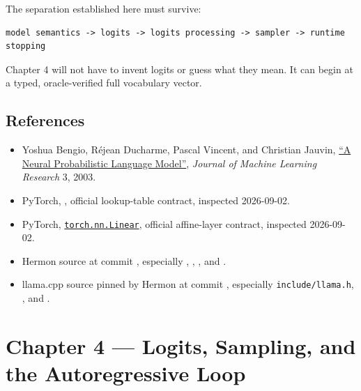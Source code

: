 \documentclass[
  10pt,
]{article}
\providecommand{\tightlist}{%
  \setlength{\itemsep}{0pt}\setlength{\parskip}{0pt}}
\begin{document}
The separation established here must survive:

\begin{verbatim}
model semantics -> logits -> logits processing -> sampler -> runtime stopping
\end{verbatim}

Chapter 4 will not have to invent logits or guess what they mean. It can
begin at a typed, oracle-verified full vocabulary vector.

\subsection{References}\label{references}

\begin{itemize}
\tightlist
\item
  Yoshua Bengio, Réjean Ducharme, Pascal Vincent, and Christian Jauvin,
  \href{https://jmlr.org/papers/v3/bengio03a.html}{``A Neural
  Probabilistic Language Model''}, \emph{Journal of Machine Learning
  Research} 3, 2003.
\item
  PyTorch,
  \href{https://docs.pytorch.org/docs/stable/generated/torch.nn.Embedding}{\texttt{}},
  official lookup-table contract, inspected 2026-09-02.
\item
  PyTorch,
  \href{https://docs.pytorch.org/docs/stable/generated/torch.nn.Linear.html}{\texttt{torch.nn.Linear}},
  official affine-layer contract, inspected 2026-09-02.
\item
  Hermon source at commit
  \texttt{},
  especially \texttt{},
  \texttt{},
  \texttt{}, and
  \texttt{}.
\item
  llama.cpp source pinned by Hermon at commit
  \texttt{},
  especially \texttt{include/llama.h},
  \texttt{}, and
  \texttt{}.
\end{itemize}

\clearpage

\section{Chapter 4 --- Logits, Sampling, and the Autoregressive
Loop}\label{chapter-4-logits-sampling-and-the-autoregressive-loop}
\end{document}
